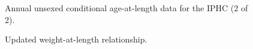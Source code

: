 \documentclass[
]{scrartcl}
\begin{document}
\begin{figure}


\caption{\label{fig-IPHC_agecomps2}Annual unsexed conditional
age-at-length data for the IPHC (2 of 2).}

\end{figure}%

\begin{figure}


\caption{\label{fig-LWrel}Updated weight-at-length relationship.}

\end{figure}%
\end{document}
